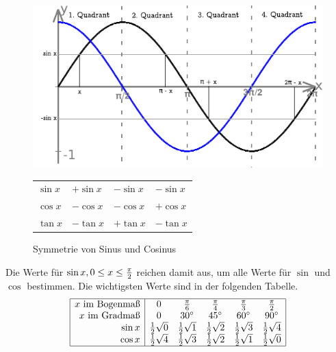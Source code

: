 \begin{figure}[hbt]
\noindent\includegraphics{img/symmetrie.pdf}

\vspace{-.15cm}
\hspace{.68cm}
\begin{tabular}{|p{1.56cm}|p{1.6cm}|p{1.6cm}|p{1.55cm}|}
 $\sin x$ & $+\sin x$ & $-\sin x$ & $-\sin x$\\
 $\cos x$ & $-\cos x$ & $-\cos x$ & $+\cos x$\\
 $\tan x$ & $-\tan x$ & $+\tan x$ & $-\tan x$\\
\hline
\end{tabular}
\label{fig:symmetrie}
\caption{Symmetrie von Sinus und Cosinus}
\end{figure}

Die Werte für $\sin x, 0 \leq x \leq \frac{\pi}{2}$ reichen damit aus, um alle
Werte für $\sin$ und $\cos$ bestimmen. Die wichtigsten Werte sind in der
folgenden Tabelle.
\[\begin{array}{|r|ccccc|}\hline
 x \text{ im Bogenmaß} & 0 & \frac{\pi}{6} &
\frac{\pi}{4} & \frac{\pi}{3} &
\frac{\pi}{2}\\
 x \text{ im Gradmaß}  & 0 & 30^\circ & 45^\circ & 60^\circ & 90^\circ\\
 \sin x                & \frac{1}{2}\sqrt{0} & \frac{1}{2}\sqrt{1}
& \frac{1}{2}\sqrt{2} &\frac{1}{2}\sqrt{3} & \frac{1}{2}\sqrt{4}\\
 \cos x    & \frac{1}{2}\sqrt{4} & \frac{1}{2}\sqrt{3} & \frac{1}{2}\sqrt{2}
 & \frac{1}{2}\sqrt{1} & \frac{1}{2}\sqrt{0}\\\hline
\end{array}\]



